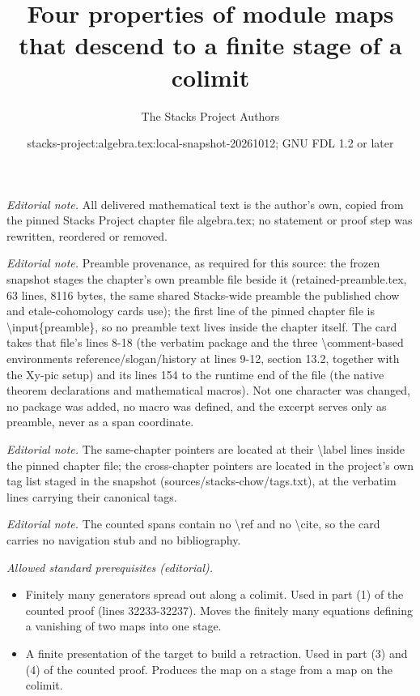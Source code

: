 \documentclass[10pt,a4paper]{amsart}
\title{Four properties of module maps that descend to a finite stage of a colimit}
\author{The Stacks Project Authors}
\date{stacks-project:algebra.tex:local-snapshot-20261012; GNU FDL 1.2 or later}
\theoremstyle{plain}
\theoremstyle{definition}
\theoremstyle{remark}
\numberwithin{equation}{subsection}
\begin{document}
\maketitle
\noindent\textit{Editorial note.} All delivered mathematical text is the author's own, copied from the pinned Stacks Project chapter file algebra.tex; no statement or proof step was rewritten, reordered or removed.\par\medskip
\noindent\textit{Editorial note.} Preamble provenance, as required for this source: the frozen snapshot stages the chapter's own preamble file beside it (retained-preamble.tex, 63 lines, 8116 bytes, the same shared Stacks-wide preamble the published chow and etale-cohomology cards use); the first line of the pinned chapter file is \textbackslash{}input\{preamble\}, so no preamble text lives inside the chapter itself. The card takes that file's lines 8-18 (the verbatim package and the three \textbackslash{}comment-based environments reference/slogan/history at lines 9-12, section 13.2, together with the Xy-pic setup) and its lines 154 to the runtime end of the file (the native theorem declarations and mathematical macros). Not one character was changed, no package was added, no macro was defined, and the excerpt serves only as preamble, never as a span coordinate.\par\medskip
\noindent\textit{Editorial note.} The same-chapter pointers are located at their \textbackslash{}label lines inside the pinned chapter file; the cross-chapter pointers are located in the project's own tag list staged in the snapshot (sources/stacks-chow/tags.txt), at the verbatim lines carrying their canonical tags.\par\medskip
\noindent\textit{Editorial note.} The counted spans contain no \textbackslash{}ref and no \textbackslash{}cite, so the card carries no navigation stub and no bibliography.\par\medskip
\noindent\textit{Allowed standard prerequisites (editorial).}\begin{itemize}
\item Finitely many generators spread out along a colimit. Used in part (1) of the counted proof (lines 32233-32237). Moves the finitely many equations defining a vanishing of two maps into one stage.
\item A finite presentation of the target to build a retraction. Used in part (3) and (4) of the counted proof. Produces the map on a stage from a map on the colimit.
\end{itemize}\medskip
\end{document}
